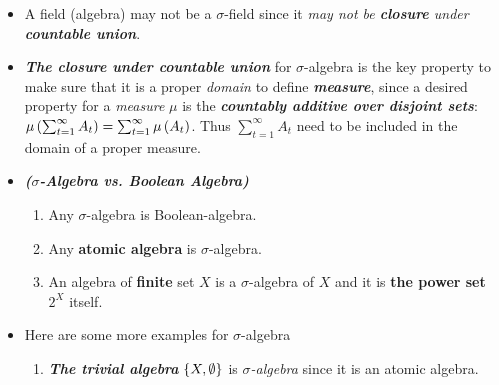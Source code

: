 \documentclass[11pt]{article}
\begin{document}
\begin{itemize}
\item \begin{remark}
A field (algebra) may not be a $\sigma$-field since it \emph{may not be \textbf{closure} under \textbf{countable union}}.
\end{remark}



\item \begin{remark}
\emph{\textbf{The closure under countable union}} for $\sigma$-algebra is the key property to make sure that it is a proper \emph{domain} to define  \emph{\textbf{measure}}, since a desired property for a \emph{measure} $\mu$ is the \emph{\textbf{countably additive over disjoint sets}}:  $\mu\left(\sum_{t=1}^{\infty}A_{t}\right) = \sum_{t=1}^{\infty}\mu\left(A_{t}\right)$. Thus $\sum_{t=1}^{\infty}A_{t}$ need to be included in the domain of a proper measure. 
\end{remark}

\item \begin{remark} \emph{\textbf{($\sigma$-Algebra vs. Boolean Algebra)}}
\begin{enumerate}
\item \begin{proposition}
Any $\sigma$-algebra is Boolean-algebra. 
\end{proposition}

\item \begin{proposition}
Any \textbf{atomic algebra} is $\sigma$-algebra. 
\end{proposition}

\item  \begin{proposition}
An algebra of \textbf{finite} set $X$ is  a $\sigma$-algebra of $X$ and it is \textbf{the power set} $2^{X}$ itself. 
\end{proposition}
\end{enumerate}
\end{remark}

\item 
\begin{example} Here are some more examples for  $\sigma$-algebra \citep{tao2011introduction}
\begin{enumerate}
\item \emph{\textbf{The trivial algebra}} $\left\{X, \emptyset\right\}$ is \emph{$\sigma$-algebra} since it is an atomic algebra.


\end{enumerate}
\end{example}
\end{itemize}
\end{document}
